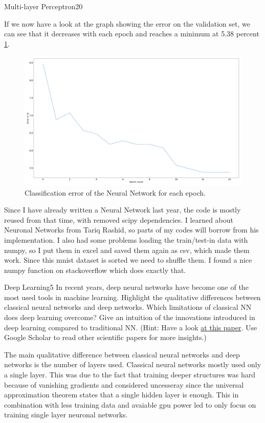 \begin{questions}
\begin{question}{Multi-layer Perceptron}{20}
\begin{answer}
If we now have a look at the graph showing the error on the validation set, we can see that it decreases with each epoch and reaches a minimum at 5.38 percent \ref{fig:nn}. 
\end{answer}
\begin{figure}[H]
	\includegraphics[width=0.8\linewidth]{pictures/NN_loss.png}
	\centering
	\caption{Classification error of the Neural Network for each epoch.}
	\label{fig:nn}
\end{figure}

Since I have already written a Neural Network last year, the code is mostly reused from that time, with removed scipy dependencies. I learned about Neuronal Networks from Tariq Rashid, so parts of my codes will borrow from his implementation. I also had some problems loading the train/test-in data with numpy, so I put them in excel and saved them again as csv, which made them work. Since this mnist dataset is sorted we need to shuffle them. I found a nice numpy function on stackoverflow which does exactly that. 

\end{question}


\begin{question}[bonus]{Deep Learning}{5}
In recent years, deep neural networks have become one of the most used tools in machine learning. 
Highlight the qualitative differences between classical neural networks and deep networks. Which limitations of classical NN does deep learning overcome?
Give an intuition of the innovations introduced in deep learning compared to traditional NN.
(Hint: Have a look \href{http://arxiv.org/abs/1206.5538}{at this paper}. Use Google Scholar to read other scientific papers for more insights.)

\begin{answer}
The main qualitative difference between classical neural networks and deep networks is the number of layers used. Classical neural networks mostly used only a single layer. This was due to the fact that training deeper structures was hard because of vanishing gradients and considered uncesseray since the universal approximation theorem states that a single hidden layer is enough. This in combination with less training data and avaiable gpu power led to only focus on training single layer neuronal networks. 


\end{answer}
\end{question}
\end{questions}
